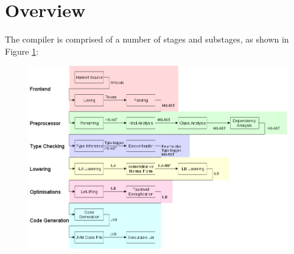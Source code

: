\documentclass[dissertation.tex]{subfiles}
\begin{document}
\section{Overview}
{

    The compiler is comprised of a number of stages and substages, as shown in Figure \ref{fig:compiler-layout}:

    \begin{figure}[h]
        \includegraphics[width=\textwidth]{figures/compiler-layout.png}
        \caption{}
        \label{fig:compiler-layout}
    \end{figure}

}
\end{document}
